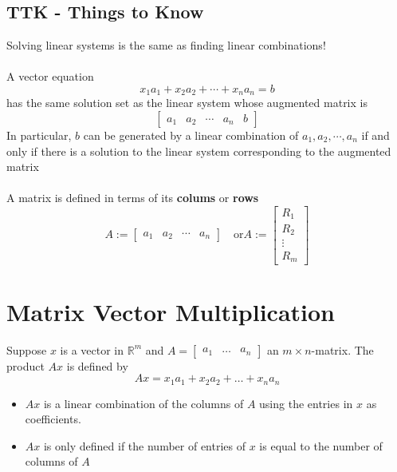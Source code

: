 \subsection{TTK - Things to Know}
Solving linear systems is the same as finding linear combinations! \\\\
A vector equation
\[
  x_1a_1 + x_2a_2 + \cdots + x_na_n = b
\]
has the same solution set as the linear system whose augmented matrix is
\[ \left[
  \begin{array}{cccc|c}
    a_1 & a_2 & \cdots & a_n & b
  \end{array}
\right] \]
In particular, $b$ can be generated by a linear combination of $a_1, a_2, \cdots,
a_n$ if and only if there is a solution to the linear system corresponding to
the augmented matrix \\\\
A matrix is defined in terms of its \textbf{colums} or \textbf{rows}
\[
  A := \begin{bmatrix}
      a_1 & a_2 & \cdots & a_n
  \end{bmatrix} \quad \text{or}
  A := \begin{bmatrix}
      R_1 \\ R_2 \\ \vdots \\ R_m
  \end{bmatrix}
\]

\section{Matrix Vector Multiplication}
Suppose $x$ is a vector in $\mathbb{R}^m$ and $A = \begin{bmatrix}
  a_1 & \dots & a_n
\end{bmatrix}$ an $m \times n$-matrix. The product $Ax$ is defined by
\[
  Ax = x_1a_1 + x_2a_2 + \dots + x_na_n
\]
\begin{itemize}
  \item $Ax$ is a linear combination of the columns of $A$ using the entries 
    in $x$ as coefficients.
  \item $Ax$ is only defined if the number of entries of $x$ is equal to
    the number of columns of $A$
\end{itemize}
